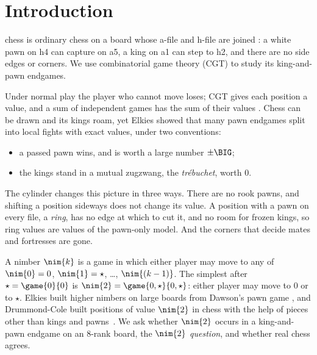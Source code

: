 \section{Introduction}\label{sec:intro}

 chess is ordinary chess on a board whose a-file and h-file are joined
\cite{Pritchard}: a white pawn on h4 can capture on a5, a king on a1 can step to h2, and there are no side edges or
corners. We use combinatorial game theory (CGT) to study its king-and-pawn endgames.

Under normal play the player who cannot move loses; CGT gives each position a value, and a sum of independent
games has the sum of their values \cite{ONAG,WinningWays,Siegel2013}. Chess can be drawn and its kings roam,
yet Elkies \cite{Elkies1996} showed that many pawn endgames split into local fights with exact values, under
two conventions:
\begin{itemize}
\item a passed pawn wins, and is worth a large number $\pm\BIG$;
\item the kings stand in a mutual zugzwang, the \emph{tr\'ebuchet}, worth $0$.
\end{itemize}

The cylinder changes this picture in three ways. There are no rook pawns, and shifting a position sideways
does not change its value. A position with a pawn on every file, a \emph{ring}, has no edge at which to cut
it, and no room for frozen kings, so ring values are values of the pawn-only model. And the corners that decide mates and fortresses are gone.

A nimber $\nim{k}$ is a game in which either player may move to any of $\nim{0}=0$, $\nim{1}=\star$,
\dots, $\nim{(k-1)}$. The simplest after $\star=\game{0}{0}$ is $\nim{2}=\game{0,\star}{0,\star}$: either player
may move to $0$ or to $\star$. Elkies built higher nimbers on large boards from Dawson's pawn game \cite{Elkies2002,Dawson1935}, and
Drummond-Cole built positions of value $\nim{2}$ in chess with the help of pieces other than kings and
pawns~\cite{DrummondCole2005}. We ask whether $\nim{2}$ occurs in a king-and-pawn endgame on an 8-rank board,
the \emph{$\nim{2}$ question}, and whether real chess agrees.


